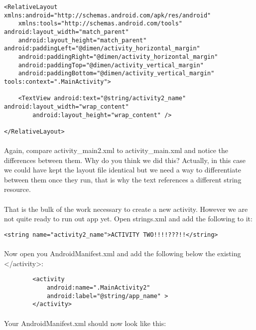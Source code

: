 \begin{lstlisting}
<RelativeLayout xmlns:android="http://schemas.android.com/apk/res/android"
    xmlns:tools="http://schemas.android.com/tools" android:layout_width="match_parent"
    android:layout_height="match_parent" android:paddingLeft="@dimen/activity_horizontal_margin"
    android:paddingRight="@dimen/activity_horizontal_margin"
    android:paddingTop="@dimen/activity_vertical_margin"
    android:paddingBottom="@dimen/activity_vertical_margin" tools:context=".MainActivity">

    <TextView android:text="@string/activity2_name" android:layout_width="wrap_content"
        android:layout_height="wrap_content" />

</RelativeLayout>
\end{lstlisting}

\paragraph{} Again, compare activity\_main2.xml to activity\_main.xml and notice the differences between them. Why do you think we did this? Actually, in this case we could have kept the layout file identical but we need a way to differentiate between them once they run, that is why the text references a different string resource.

\paragraph{} That is the bulk of the work necessary to create a new activity. However we are not quite ready to run out app yet. Open strings.xml and add the following to it:

\begin{lstlisting}
<string name="activity2_name">ACTIVITY TWO!!!!???!!</string>
\end{lstlisting}

\paragraph{} Now open you AndroidManifest.xml and add the following below the existing </activity>:

\begin{lstlisting}
        <activity
            android:name=".MainActivity2"
            android:label="@string/app_name" >
        </activity>
\end{lstlisting}

\paragraph{} Your AndroidManifest.xml should now look like this:

